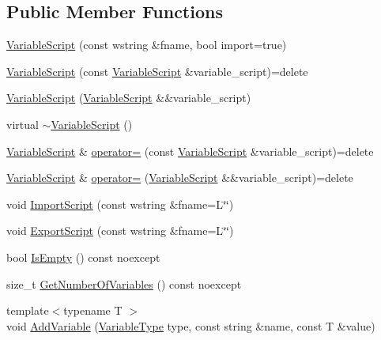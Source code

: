 \subsection*{Public Member Functions}
\begin{DoxyCompactItemize}
\item 
\hyperlink{classmage_1_1_variable_script_a4b4028a9710fcfc5fb26bb63922a90cb}{Variable\+Script} (const wstring \&fname, bool import=true)
\item 
\hyperlink{classmage_1_1_variable_script_aebd4e6cf2bdae4e57c9da428007fc4d7}{Variable\+Script} (const \hyperlink{classmage_1_1_variable_script}{Variable\+Script} \&variable\+\_\+script)=delete
\item 
\hyperlink{classmage_1_1_variable_script_acb767379c723255dd07ff2a541bc5f90}{Variable\+Script} (\hyperlink{classmage_1_1_variable_script}{Variable\+Script} \&\&variable\+\_\+script)
\item 
virtual \hyperlink{classmage_1_1_variable_script_ae7026e1283b1a1164f02fdc3e1f2b829}{$\sim$\+Variable\+Script} ()
\item 
\hyperlink{classmage_1_1_variable_script}{Variable\+Script} \& \hyperlink{classmage_1_1_variable_script_ae090b066ea939fc6611e77a47df6a97f}{operator=} (const \hyperlink{classmage_1_1_variable_script}{Variable\+Script} \&variable\+\_\+script)=delete
\item 
\hyperlink{classmage_1_1_variable_script}{Variable\+Script} \& \hyperlink{classmage_1_1_variable_script_a4602887cc8b6c45a169af7822cf744a1}{operator=} (\hyperlink{classmage_1_1_variable_script}{Variable\+Script} \&\&variable\+\_\+script)=delete
\item 
void \hyperlink{classmage_1_1_variable_script_aaa35ef65eb958e47734c1b1fa2802712}{Import\+Script} (const wstring \&fname=L\char`\"{}\char`\"{})
\item 
void \hyperlink{classmage_1_1_variable_script_aa9b2514cd91bfde6a336c9487b91de53}{Export\+Script} (const wstring \&fname=L\char`\"{}\char`\"{})
\item 
bool \hyperlink{classmage_1_1_variable_script_a01386b6b5f5440c617909c452d9df308}{Is\+Empty} () const noexcept
\item 
size\+\_\+t \hyperlink{classmage_1_1_variable_script_aea9aaa1659bceca4d22b9ab4ba4aba7a}{Get\+Number\+Of\+Variables} () const noexcept
\item 
{\footnotesize template$<$typename T $>$ }\\void \hyperlink{classmage_1_1_variable_script_a981ec417c40c5b010fc2199a7aa44f95}{Add\+Variable} (\hyperlink{namespacemage_a530428e73bac0ba7fe84b29086a9e33a}{Variable\+Type} type, const string \&name, const T \&value)

\end{DoxyCompactItemize}
